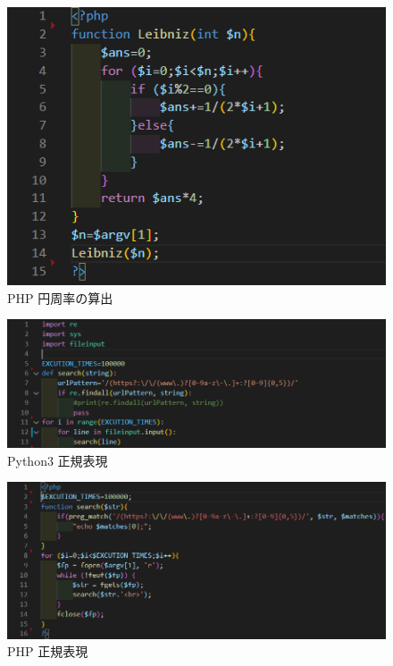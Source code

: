 \begin{figure}[tb]
    \centering
    \includegraphics[width=13.5cm,keepaspectratio]{figure/p-php.PNG}
    \caption{PHP 円周率の算出}
    \label{fig:p-php}
\end{figure}

\clearpage
\begin{figure}[tb]
    \centering
        \includegraphics[width=13.5cm,keepaspectratio]{figure/s-py.PNG}
        \caption{Python3 正規表現}
        \label{fig:s-py}
\end{figure}

\begin{figure}[tb]
    \centering
        \includegraphics[width=13.5cm,keepaspectratio]{figure/s-php.PNG}
        \caption{PHP 正規表現}
        \label{fig:s-php}
\end{figure}